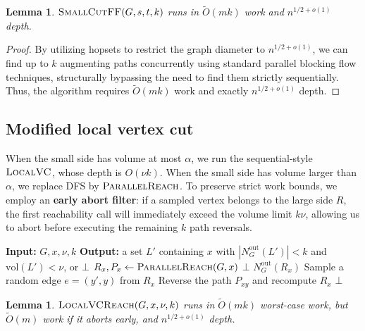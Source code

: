 \documentclass[11pt]{article}
\newtheorem{lemma}[theorem]{Lemma}
\theoremstyle{remark}
\newcommand{\tildeO}{\widetilde{O}}
\newcommand{\ParallelReach}{\textsc{ParallelReach}}
\newcommand{\LocalVC}{\textsc{LocalVC}}
\newcommand{\LocalVCReach}{\textsc{LocalVCReach}}
\newcommand{\SmallCutFF}{\textsc{SmallCutFF}}
\newcommand{\bottom}{\bot}
\newcommand{\vol}{\mathrm{vol}}
\begin{document}
\begin{lemma}
\label{lem:ff-complexity}
\(\SmallCutFF(G,s,t,k)\) runs in \(\tildeO(mk)\) work and \(n^{1/2+o(1)}\) depth.
\end{lemma}

\begin{proof}
By utilizing hopsets to restrict the graph diameter to \(n^{1/2+o(1)}\), we can find up to \(k\) augmenting paths concurrently using standard parallel blocking flow techniques, structurally bypassing the need to find them strictly sequentially. Thus, the algorithm requires \(\tildeO(mk)\) work and exactly \(n^{1/2+o(1)}\) depth.
\end{proof}

\subsection{Modified local vertex cut}
When the small side has volume at most \(\alpha\), we run the sequential-style \(\LocalVC\), whose depth is \(O(\nu k)\). When the small side has volume larger than \(\alpha\), we replace DFS by \(\ParallelReach\). To preserve strict work bounds, we employ an \textbf{early abort filter}: if a sampled vertex belongs to the large side \(R\), the first reachability call will immediately exceed the volume limit \(k\nu\), allowing us to abort before executing the remaining \(k\) path reversals.

\begin{algorithm}[H]
\caption{\(\LocalVCReach(G,x,\nu,k)\)}
\label{alg:lvc-reach}
\begin{algorithmic}[1]
\State \textbf{Input:} \(G,x,\nu,k\)
\State \textbf{Output:} a set \(L'\) containing \(x\) with \(|N_G^{\mathrm{out}}(L')|<k\) and \(\vol(L')<\nu\), or \(\bottom\)
    \State \(R_x, P_x \gets \ParallelReach(G,x)\)
        \State \Return \(\bottom\) 
    \EndIf
            \State \Return \(N_G^{\mathrm{out}}(R_x)\)
        \EndIf
        \State Sample a random edge \(e=(y',y)\) from \(R_x\)
        \State Reverse the path \(P_{xy}\) and recompute \(R_x\)
    \EndFor
\EndFor
\State \Return \(\bottom\)
\end{algorithmic}
\end{algorithm}

\begin{lemma}
\label{lem:lvc-reach-complexity}
\(\LocalVCReach(G,x,\nu,k)\) runs in \(\tildeO(mk)\) worst-case work, but \(\tildeO(m)\) work if it aborts early, and \(n^{1/2+o(1)}\) depth.
\end{lemma}
\end{document}
